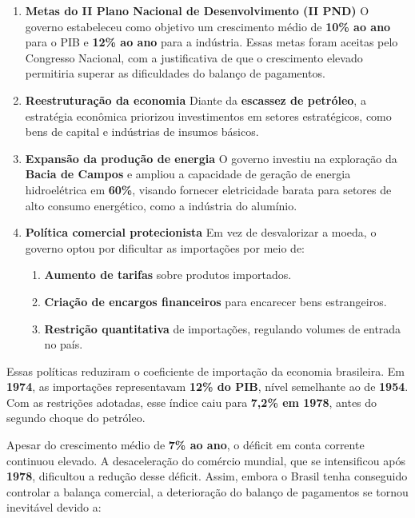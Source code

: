 \documentclass[a4paper,12pt]{article}[abntex2]
\begin{document}
\begin{enumerate}
    \item \textbf{Metas do II Plano Nacional de Desenvolvimento (II PND)}  
    O governo estabeleceu como objetivo um crescimento médio de \textbf{10\% ao ano} para o PIB e \textbf{12\% ao ano} para a indústria. Essas metas foram aceitas pelo Congresso Nacional, com a justificativa de que o crescimento elevado permitiria superar as dificuldades do balanço de pagamentos.

    \item \textbf{Reestruturação da economia}  
    Diante da \textbf{escassez de petróleo}, a estratégia econômica priorizou investimentos em setores estratégicos, como bens de capital e indústrias de insumos básicos.

    \item \textbf{Expansão da produção de energia}  
    O governo investiu na exploração da \textbf{Bacia de Campos} e ampliou a capacidade de geração de energia hidroelétrica em \textbf{60\%}, visando fornecer eletricidade barata para setores de alto consumo energético, como a indústria do alumínio.

    \item \textbf{Política comercial protecionista}  
    Em vez de desvalorizar a moeda, o governo optou por dificultar as importações por meio de:
    \begin{enumerate}
        \item \textbf{Aumento de tarifas} sobre produtos importados.
        \item \textbf{Criação de encargos financeiros} para encarecer bens estrangeiros.
        \item \textbf{Restrição quantitativa} de importações, regulando volumes de entrada no país.
    \end{enumerate}
\end{enumerate}

Essas políticas reduziram o coeficiente de importação da economia brasileira. Em \textbf{1974}, as importações representavam \textbf{12\% do PIB}, nível semelhante ao de \textbf{1954}. Com as restrições adotadas, esse índice caiu para \textbf{7,2\% em 1978}, antes do segundo choque do petróleo.

Apesar do crescimento médio de \textbf{7\% ao ano}, o déficit em conta corrente continuou elevado. A desaceleração do comércio mundial, que se intensificou após \textbf{1978}, dificultou a redução desse déficit. Assim, embora o Brasil tenha conseguido controlar a balança comercial, a deterioração do balanço de pagamentos se tornou inevitável devido a:
\end{document}
